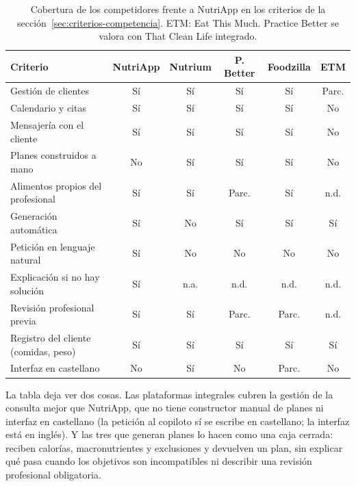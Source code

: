 \begin{table}[tb]
\centering
\small
\setlength{\tabcolsep}{4pt}
\begin{tabular}{|>{\raggedright\arraybackslash}p{4.9cm}|c|c|c|c|c|}
\hline
\textbf{Criterio} & \textbf{NutriApp} & \textbf{Nutrium} & \textbf{P. Better} & \textbf{Foodzilla} & \textbf{ETM} \\
\hline
Gestión de clientes                          & Sí    & Sí    & Sí    & Sí    & Parc. \\
\hline
Calendario y citas                           & Sí    & Sí    & Sí    & Sí    & No    \\
\hline
Mensajería con el cliente                    & Sí    & Sí    & Sí    & Sí    & No    \\
\hline
Planes construidos a mano                    & No    & Sí    & Sí    & Sí    & No    \\
\hline
Alimentos propios del profesional            & Sí    & Sí    & Parc. & Sí    & n.d.  \\
\hline
Generación automática                        & Sí    & No    & Sí    & Sí    & Sí    \\
\hline
Petición en lenguaje natural                 & Sí    & No    & No    & No    & No    \\
\hline
Explicación si no hay solución               & Sí    & n.a.  & n.d.  & n.d.  & n.d.  \\
\hline
Revisión profesional previa                  & Sí    & Sí    & Parc. & Parc. & n.d.  \\
\hline
Registro del cliente (comidas, peso)         & Sí    & Sí    & Sí    & Sí    & Sí    \\
\hline
Interfaz en castellano                       & No    & Sí    & No    & Parc. & No    \\
\hline
\end{tabular}
\caption{Cobertura de los competidores frente a NutriApp en los criterios de la sección~\ref{sec:criterios-competencia}. ETM: Eat This Much. Practice Better se valora con That Clean Life integrado.}
\label{tab:competidores}
\end{table}

La tabla deja ver dos cosas. Las plataformas integrales cubren la gestión de la consulta mejor que NutriApp, que no tiene constructor manual de planes ni interfaz en castellano (la petición al copiloto sí se escribe en castellano; la interfaz está en inglés). Y las tres que generan planes lo hacen como una caja cerrada: reciben calorías, macronutrientes y exclusiones y devuelven un plan, sin explicar qué pasa cuando los objetivos son incompatibles ni describir una revisión profesional obligatoria.


